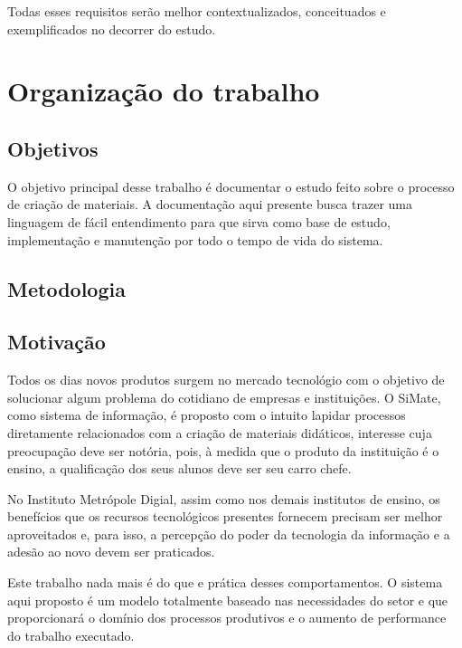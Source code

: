 Todas esses requisitos serão melhor contextualizados, conceituados e exemplificados no decorrer do estudo.

\section{Organização do trabalho}

\subsection{Objetivos}

O objetivo principal desse trabalho é documentar o estudo feito sobre o processo de criação de materiais. A documentação aqui presente busca trazer uma linguagem de fácil entendimento para que sirva como base de estudo, implementação e manutenção por todo o tempo de vida do sistema.

\subsection{Metodologia}

\subsection{Motivação}

Todos os dias novos produtos surgem no mercado tecnológio com o objetivo de solucionar algum problema do cotidiano de empresas e instituições. O SiMate, como sistema de informação, é proposto com o intuito lapidar processos diretamente relacionados com a criação de materiais didáticos, interesse cuja preocupação deve ser notória, pois, à medida que o produto da instituição é o ensino, a qualificação dos seus alunos deve ser seu carro chefe.

No Instituto Metrópole Digial, assim como nos demais institutos de ensino, os benefícios que os recursos tecnológicos presentes fornecem precisam ser melhor aproveitados e, para isso, a percepção do poder da tecnologia da informação e a adesão ao novo devem ser praticados. 

Este trabalho nada mais é do que e prática desses comportamentos. O sistema aqui proposto é um modelo totalmente baseado nas necessidades do setor e que proporcionará o domínio dos processos produtivos e o aumento de performance do trabalho executado.
